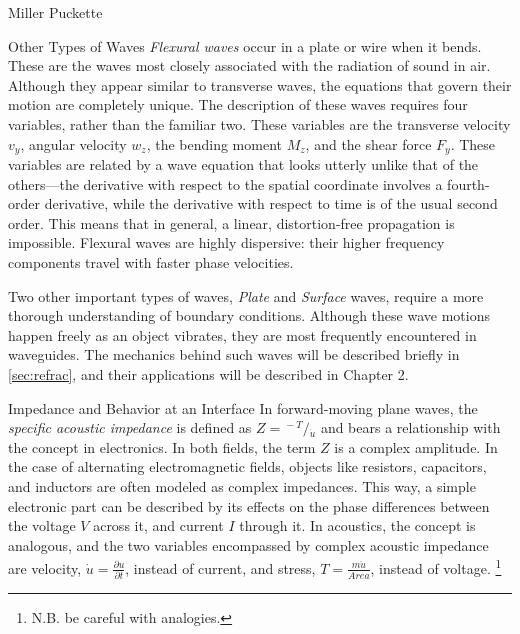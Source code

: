 \documentclass[a4paper,10pt]{report}
\numberwithin{equation}{section}
\begin{document}
\begin{chapter}{Miller Puckette}
\begin{section}{Other Types of Waves}
\emph{Flexural waves} occur in a plate or wire when it bends. These are the waves most closely associated with the radiation of sound in air. Although they appear similar to transverse waves, the equations that govern their motion are completely unique. The description of these waves requires four variables, rather than the familiar two. These variables are the transverse velocity $v_y$, angular velocity $w_z$, the bending moment $M_z$, and the shear force $F_y$. These variables are related by a wave equation that looks utterly unlike that of the others---the derivative with respect to the spatial coordinate involves a fourth-order derivative, while the derivative with respect to time is of the usual second order. This means that in general, a linear, distortion-free propagation is impossible. Flexural waves are highly dispersive: their higher frequency components travel with faster phase velocities. \cite[p.~95]{Cremer1973}

Two other important types of waves, \emph{Plate} and \emph{Surface} waves, require a more thorough understanding of boundary conditions. Although these wave motions happen freely as an object vibrates, they are most frequently encountered in waveguides. The mechanics behind such waves will be described briefly in \ref{sec:refrac}, and their applications will be described in Chapter 2.

\end{section}


\begin{section}{Impedance and Behavior at an Interface}\label{sec:impedance}
In forward-moving plane waves, the \emph{specific acoustic impedance} is defined as $Z = {}^{{}{}-T}/{}_{\dot{u}}$ and bears a relationship with the concept in electronics. In both fields, the term $Z$ is a complex amplitude. In the case of alternating electromagnetic fields, objects like resistors, capacitors, and inductors are often modeled as complex impedances. This way, a simple electronic part can be described by its effects on the phase differences between the voltage $V$ across it, and current $I$ through it.\cite[p.~168]{scherz07} In acoustics, the concept is analogous, and the two variables encompassed by complex acoustic impedance are velocity, $\dot{u} = \frac{\partial u}{\partial t}$, instead of current, and stress, $T = \frac{m\ddot{u}}{Area}$, instead of voltage.\cite[p.~9]{Cremer1973} \footnote{ N.B. be careful with analogies.}


\end{section}
\end{chapter}
\end{document}

